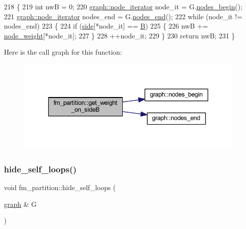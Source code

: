 \begin{DoxyCode}
218 \{
219     \textcolor{keywordtype}{int} nwB = 0;
220     \mbox{\hyperlink{classgraph_a2cb374b84c133ce13f94e73c3e5da7fa}{graph::node\_iterator}} node\_it = G.\mbox{\hyperlink{classgraph_aec053a4b509d1be804237a80044c54c0}{nodes\_begin}}();
221     \mbox{\hyperlink{classgraph_a2cb374b84c133ce13f94e73c3e5da7fa}{graph::node\_iterator}} nodes\_end = G.\mbox{\hyperlink{classgraph_abbf9c0cb5629e98e1142254911238173}{nodes\_end}}();
222     \textcolor{keywordflow}{while} (node\_it != nodes\_end)
223     \{
224     \textcolor{keywordflow}{if} (\mbox{\hyperlink{classfm__partition_af83309e781e9658fc0ff923ced087bfc}{side}}[*node\_it] == \mbox{\hyperlink{classfm__partition_a42515c44eecb7ba3e2ec549a877ef238}{B}})
225     \{
226         nwB += \mbox{\hyperlink{classfm__partition_ae1ba643b4bd6721075ab7b608bcf3cd6}{node\_weight}}[*node\_it];
227     \}
228     ++node\_it;
229     \}
230     \textcolor{keywordflow}{return} nwB;
231 \}
\end{DoxyCode}
Here is the call graph for this function\+:\nopagebreak
\begin{figure}[H]
\begin{center}
\leavevmode
\includegraphics[width=336pt]{classfm__partition_a9e380da1dc654fcffdf4ac2418c6ef80_cgraph}
\end{center}
\end{figure}
\mbox{\label{classfm__partition_a3e3aa22119ff5ff9c406683e22ab6078}} 
\subsubsection{\texorpdfstring{hide\+\_\+self\+\_\+loops()}{hide\_self\_loops()}}
{\footnotesize\ttfamily void fm\+\_\+partition\+::hide\+\_\+self\+\_\+loops (\begin{DoxyParamCaption}\item[{\mbox{\hyperlink{classgraph}{graph}} \&}]{G }\end{DoxyParamCaption})\hspace{0.3cm}{\ttfamily [protected]}}



